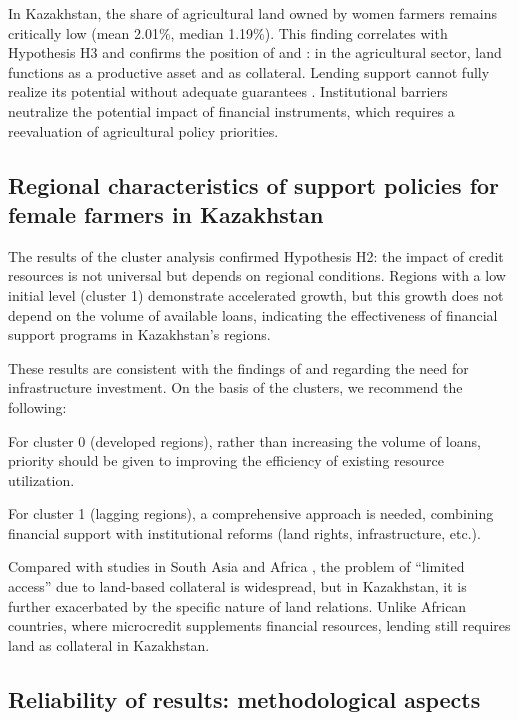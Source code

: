 ﻿\documentclass[pdflatex,sn-mathphys-ay]{sn-jnl}
\begin{document}
In Kazakhstan, the share of agricultural land owned by women farmers
remains critically low (mean 2.01\%, median 1.19\%). This finding
correlates with Hypothesis H3 and confirms the position of
\citet{ref20} and \citet{ref06}: in the agricultural sector, land
functions as a productive asset and as collateral. Lending support
cannot fully realize its potential without adequate guarantees
\citep{ref26,ref02}. Institutional barriers
neutralize the potential impact of financial instruments, which requires
a reevaluation of agricultural policy priorities.

\subsection{Regional characteristics of support policies for female farmers in Kazakhstan}

The results of the cluster analysis confirmed Hypothesis H2: the impact
of credit resources is not universal but depends on regional conditions.
Regions with a low initial level (cluster 1) demonstrate accelerated
growth, but this growth does not depend on the volume of available
loans, indicating the effectiveness of financial support programs in
Kazakhstan's regions.

These results are consistent with the findings of \citet{ref21} and \citet{ref54} regarding the need for infrastructure
investment. On the basis of the clusters, we recommend the following:

For cluster 0 (developed regions), rather than increasing the volume of
loans, priority should be given to improving the efficiency of existing
resource utilization.

For cluster 1 (lagging regions), a comprehensive approach is needed,
combining financial support with institutional reforms (land rights,
infrastructure, etc.).

Compared with studies in South Asia \citep{ref44} and Africa
\citep{ref27}, the problem of ``limited access'' due to
land-based collateral is widespread, but in Kazakhstan, it is further
exacerbated by the specific nature of land relations. Unlike African
countries, where microcredit supplements financial resources, lending
still requires land as collateral in Kazakhstan.

\subsection{Reliability of results: methodological aspects}
\end{document}
